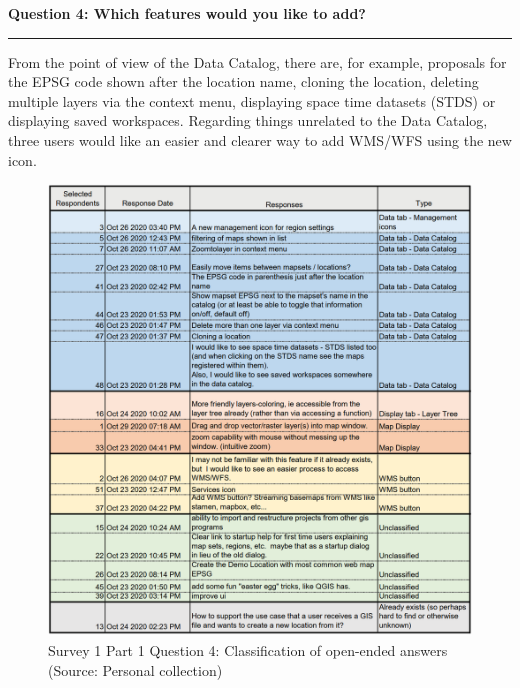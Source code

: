 \documentclass[a4paper,10pt,twoside]{article}
\begin{document}
\newpage
\noindent \textbf{Question 4: Which features would you like to add?}
\par\noindent\rule{\textwidth}{0.4pt}
\noindent From the point of view of the Data Catalog, there are, for example, proposals for the EPSG code shown after the location name, cloning the location, deleting multiple layers via the context menu, displaying space time datasets (STDS) or displaying saved workspaces. Regarding things unrelated to the Data Catalog, three users would like an easier and clearer way to add WMS/WFS using the new icon.

\begin{figure}[hbt!] 
\begin{center}
\includegraphics[width=16cm]{../surveys/analyzed_data/survey1_part1_question4_open_ended.png} 
\caption[Survey 1 Part 1 Question 4: Classification of open-ended answers]{Survey 1 Part 1 Question 4: Classification of open-ended answers (Source: Personal collection)}
\label{fig:survey1_part1_question4_open_ended}
\end{center}
\end{figure}
\end{document}

